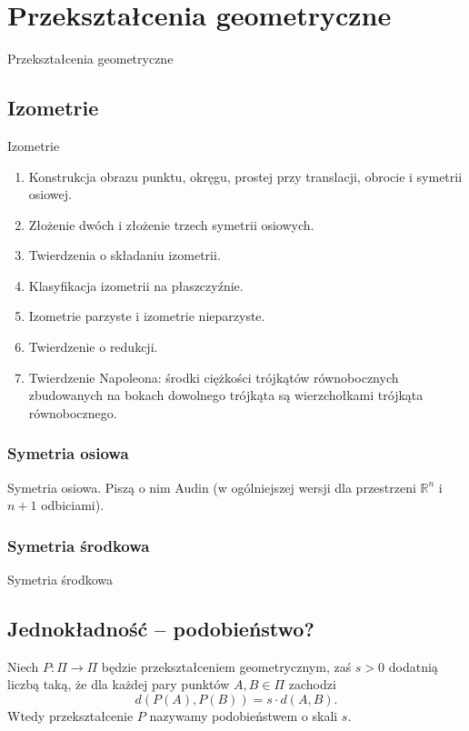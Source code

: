 \chapter{Przekształcenia geometryczne}
Przekształcenia geometryczne

\section{Izometrie}
Izometrie

\begin{enumerate}
    \item Konstrukcja obrazu punktu, okręgu, prostej przy translacji, obrocie i symetrii osiowej.
    \item Złożenie dwóch i złożenie trzech symetrii osiowych.
    \item Twierdzenia o składaniu izometrii.
    \item Klasyfikacja izometrii na płaszczyźnie.
    \item Izometrie parzyste i izometrie nieparzyste.
    \item Twierdzenie o redukcji.
    \item Twierdzenie Napoleona: środki ciężkości trójkątów równobocznych zbudowanych na bokach dowolnego trójkąta są wierzchołkami trójkąta równobocznego. %
\end{enumerate}

\subsection{Symetria osiowa}
Symetria osiowa.
Piszą o nim Audin \cite[s. 49]{audin_2003} (w ogólniejszej wersji dla przestrzeni $\mathbb R^n$ i $n+1$ odbiciami).


\subsection{Symetria środkowa}
Symetria środkowa

\section{Jednokładność -- podobieństwo?}

\begin{definition}[podobieństwo]
    Niech $P \colon \Pi \to \Pi$ będzie przekształceniem geometrycznym, zaś $s > 0$ dodatnią liczbą taką, że dla każdej pary punktów $A, B \in \Pi$ zachodzi
    \begin{equation}
        d(P(A), P(B)) = s \cdot d(A, B).
    \end{equation}
    Wtedy przekształcenie $P$ nazywamy podobieństwem o skali $s$.
\end{definition}

